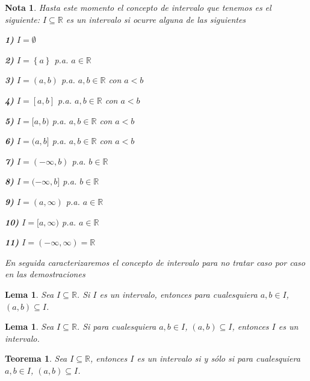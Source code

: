 \documentclass[oneside]{book} %
\theoremstyle{Teorema}
\newtheorem{Teorema}[Definicion]{Teorema}
\newtheorem{Lema}[Definicion]{Lema}
\newtheorem{Nota}[Definicion]{Nota}
\theoremstyle{Ejemplos}
\theoremstyle{[Obs]}
\renewcommand{\{}{\left\lbrace} %
\renewcommand{\}}{\right\rbrace} %
\renewcommand{\sc}{\subseteq} %
\newcommand{\R}{\mathbb{R}} %
\begin{document}
			\begin{Nota}\setlength{\parindent}{0em}
			
				Hasta este momento el concepto de intervalo que tenemos es el siguiente: $I \sc \R$ es un intervalo si ocurre alguna de las siguientes

				\textbf{1)} $I = \emptyset$

				\textbf{2)} $I = \{ a \}$ p.a. $a \in \R$
				
				\textbf{3)} $I = (a, b)$ p.a. $a, b \in \R$ con $a < b$

				\textbf{4)} $I = [a, b]$ p.a. $a, b \in \R$ con $a < b$

				\textbf{5)} $I = [a, b)$ p.a. $a, b \in \R$ con $a < b$

				\textbf{6)} $I = (a, b]$ p.a. $a, b \in \R$ con $a < b$

				\textbf{7)} $I = (-\infty, b)$ p.a. $b \in \R$

				\textbf{8)} $I = (-\infty, b]$ p.a. $b \in \R$

				\textbf{9)} $I = (a, \infty)$ p.a. $a \in \R$

				\textbf{10)} $I = [a, \infty)$ p.a. $a \in \R$

				\textbf{11)} $I = (-\infty, \infty) = \R$

				En seguida caracterizaremos el concepto de intervalo para no tratar caso por caso en las demostraciones

			\end{Nota}

			\begin{Lema}\setlength{\parindent}{0em}
			
				Sea $I \sc \R$. Si $I$ es un intervalo, entonces para cualesquiera $a, b \in I$, $(a, b) \sc I$.
			
			\end{Lema}

			\begin{Lema}\setlength{\parindent}{0em}
			
				Sea $I \sc \R$. Si para cualesquiera $a, b \in I$, $(a, b) \sc I$, entonces $I$ es un intervalo.
			
			\end{Lema}

			\begin{Teorema}\setlength{\parindent}{0em}
			
				Sea $I \sc \R$, entonces $I$ es un intervalo si y sólo si para cualesquiera $a, b \in I$, $(a, b) \sc I$.
			
			\end{Teorema}
\end{document}

